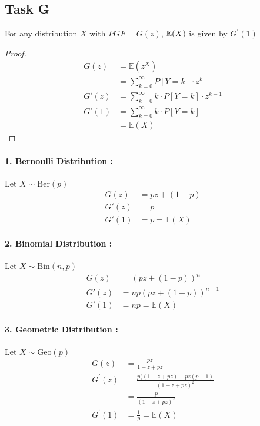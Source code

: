 \subsection*{Task G}
\begin{claim}
	For any distribution \(X\) with \(PGF = G(z)\), \(\mathbb{E}(X)\) is given by \(G^{'}(1)\)
\end{claim}
\begin{proof}
	\begin{align*}
		G(z)  & = \mathbb{E}(z^X)                                    \\
		      & = \sum_{k=0}^{\infty} P[Y = k] \cdot z^k             \\
		G'(z) & = \sum_{k=0}^{\infty} k \cdot P[Y = k] \cdot z^{k-1} \\
		G'(1) & = \sum_{k=0}^{\infty} k \cdot P[Y = k]               \\
		      & = \mathbb{E}(X)
	\end{align*}
\end{proof}
\paragraph{1. Bernoulli Distribution :} Let \(X \sim \textrm{Ber}(p)\)
\begin{align*}
	G(z)  & = pz + (1-p)        \\
	G'(z) & = p                 \\
	G'(1) & = p = \mathbb{E}(X)
\end{align*}
\paragraph{2. Binomial Distribution :}Let \(X \sim \textrm{Bin}(n,p)\)
\begin{align*}
	G(z)  & = {(pz + (1-p))^n}     \\
	G'(z) & = np(pz + (1-p))^{n-1} \\
	G'(1) & = np = \mathbb{E}(X)
\end{align*}
\paragraph{3. Geometric Distribution :}Let \(X \sim \textrm{Geo}(p)\)
\begin{align*}
	G(z)     & = \frac{pz}{1-z + pz}                     \\
	G^{'}(z) & = \frac{p((1-z+pz) - pz(p-1)}{(1-z+pz)^2} \\
	         & = \frac{p}{(1-z+pz)^2}                    \\
	G^{'}(1) & = \frac{1}{p} = \mathbb{E}(X)             \\
\end{align*}
